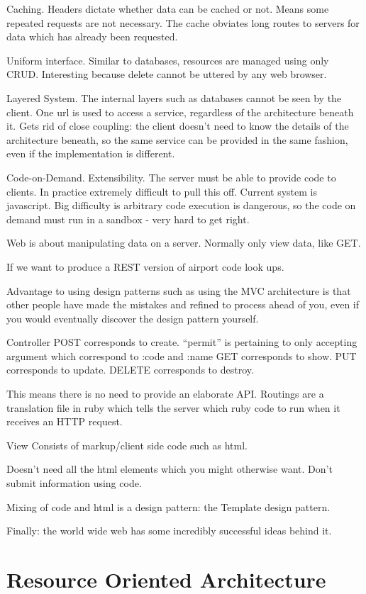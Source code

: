 \documentclass[11pt]{article}
\begin{document}
Caching. Headers dictate whether data can be cached or not. Means some repeated requests are not necessary. The cache obviates long routes to servers for data which has already been requested.

Uniform interface. Similar to databases, resources are managed using only CRUD. Interesting because delete cannot be uttered by any web browser.

Layered System. The internal layers such as databases cannot be seen by the client. One url is used to access a service, regardless of the architecture beneath it. Gets rid of close coupling: the client doesn't need to know the details of the architecture beneath, so the same service can be provided in the same fashion, even if the implementation is different.

Code-on-Demand. Extensibility. The server must be able to provide code to clients. In practice extremely difficult to pull this off. Current system is javascript. Big difficulty is arbitrary code execution is dangerous, so the code on demand must run in a sandbox - very hard to get right.

Web is about manipulating data on a server. Normally only view data, like GET.

If we want to produce a REST version of airport code look ups.

Advantage to using design patterns such as using the MVC architecture is that other people have made the mistakes and refined to process ahead of you, even if you would eventually discover the design pattern yourself.

Controller
POST corresponds to create. ``permit'' is pertaining to only accepting argument which correspond to :code and :name
GET corresponds to show.
PUT corresponds to update.
DELETE corresponds to destroy.

This means there is no need to provide an elaborate API. Routings are a translation file in ruby which tells the server which ruby code to run when it receives an HTTP request.

View
Consists of markup/client side code such as html.

Doesn't need all the html elements which you might otherwise want.
Don't submit information using code.

Mixing of code and html is a design pattern: the Template design pattern.

Finally: the world wide web has some incredibly successful ideas behind it.

\section{Resource Oriented Architecture}
\end{document}
